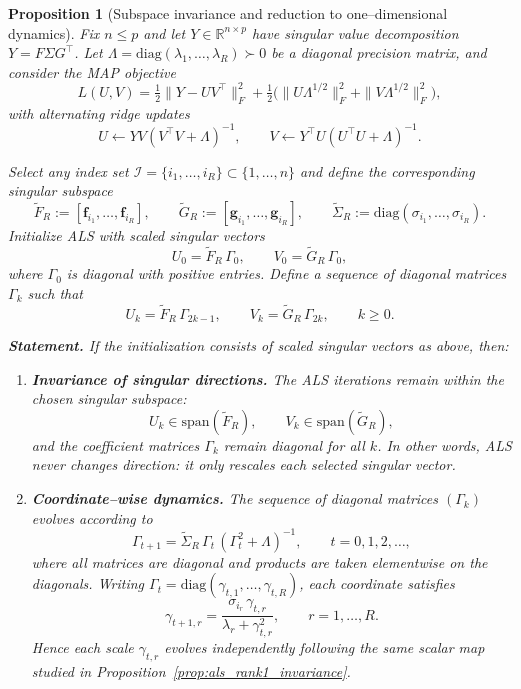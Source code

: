 \documentclass[11pt]{article}
\theoremstyle{spaced}
\newtheorem{proposition}{Proposition}
\begin{document}
\begin{proposition}[Subspace invariance and reduction to one--dimensional dynamics]
\label{prop:als_subspace_invariance}
Fix $n\le p$ and let $Y\in\mathbb{R}^{n\times p}$ have singular value decomposition 
$Y = F\Sigma G^\top$. 
Let $\Lambda = \mathrm{diag}(\lambda_1,\dots,\lambda_R)\succ0$ be a diagonal precision matrix, and consider the MAP objective
\[
L(U,V)
= \tfrac12\|Y-UV^\top\|_F^2
+ \tfrac12\big(\|U\Lambda^{1/2}\|_F^2 + \|V\Lambda^{1/2}\|_F^2\big),
\]
with alternating ridge updates
\[
U \leftarrow YV(V^\top V+\Lambda)^{-1},\qquad
V \leftarrow Y^\top U(U^\top U+\Lambda)^{-1}.
\]

Select any index set $\mathcal{I}=\{i_1,\dots,i_R\}\subset\{1,\dots,n\}$ and define the corresponding singular subspace
\[
\tilde F_R := [\mathbf{f}_{i_1},\dots,\mathbf{f}_{i_R}],\qquad
\tilde G_R := [\mathbf{g}_{i_1},\dots,\mathbf{g}_{i_R}],\qquad
\tilde\Sigma_R := \mathrm{diag}(\sigma_{i_1},\dots,\sigma_{i_R}).
\]
Initialize ALS with \emph{scaled singular vectors}
\[
U_0 = \tilde F_R\,\Gamma_0,\qquad 
V_0 = \tilde G_R\,\Gamma_0,
\]
where $\Gamma_0$ is diagonal with positive entries. 
Define a sequence of diagonal matrices $\Gamma_k$ such that
\[
U_k = \tilde F_R\,\Gamma_{2k-1},\qquad
V_k = \tilde G_R\,\Gamma_{2k},\qquad k\ge0.
\]

\noindent\textbf{Statement.}
If the initialization consists of scaled singular vectors as above, then:

\begin{enumerate}[label=(\roman*)]

\item \textbf{Invariance of singular directions.}
The ALS iterations remain within the chosen singular subspace:
\[
U_k \in \mathrm{span}(\tilde F_R),\qquad
V_k \in \mathrm{span}(\tilde G_R),
\]
and the coefficient matrices $\Gamma_k$ remain diagonal for all $k$. 
In other words, ALS \emph{never changes direction}: it only rescales each selected singular vector.

\item \textbf{Coordinate--wise dynamics.}
The sequence of diagonal matrices $(\Gamma_k)$ evolves according to
\[
\Gamma_{t+1}
= \tilde\Sigma_R\,\Gamma_t\,(\Gamma_t^2+\Lambda)^{-1},\qquad t=0,1,2,\dots,
\]
where all matrices are diagonal and products are taken elementwise on the diagonals.
Writing $\Gamma_t=\mathrm{diag}(\gamma_{t,1},\dots,\gamma_{t,R})$, each coordinate satisfies
\[
\gamma_{t+1,r}
= \frac{\sigma_{i_r}\,\gamma_{t,r}}{\lambda_r+\gamma_{t,r}^2},
\qquad r=1,\dots,R.
\]
Hence each scale $\gamma_{t,r}$ evolves independently following the same scalar map studied in Proposition~\ref{prop:als_rank1_invariance}.


\end{enumerate}
\end{proposition}
\end{document}
